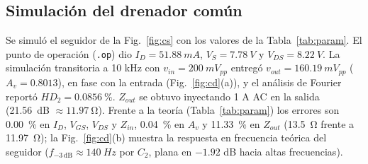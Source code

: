 \documentclass[conference]{IEEEtran}
\begin{document}
\subsection{Simulación del drenador común}
\label{sec:sim_cd}
Se simuló el seguidor de la Fig.~\ref{fig:cs} con los valores de la Tabla~\ref{tab:param}. El punto de operación (\texttt{.op}) dio $I_D=\SI{51.88}{mA}$, $V_S=\SI{7.78}{V}$ y $V_{DS}=\SI{8.22}{V}$. La simulación transitoria a 10 kHz con $v_{in}=\SI{200}{mV_{pp}}$ entregó $v_{out}=\SI{160.19}{mV_{pp}}$ ($A_v=0.8013$), en fase con la entrada (Fig.~\ref{fig:cd}(a)), y el análisis de Fourier reportó $HD_2=\SI{0.0856}{\percent}$. $Z_{out}$ se obtuvo inyectando 1 A AC en la salida (\SI{21.56}{dB} $\approx\SI{11.97}{\ohm}$). Frente a la teoría (Tabla~\ref{tab:param}) los errores son \SI{0.00}{\percent} en $I_D$, $V_{GS}$, $V_{DS}$ y $Z_{in}$, \SI{0.04}{\percent} en $A_v$ y \SI{11.33}{\percent} en $Z_{out}$ (\SI{13.5}{\ohm} frente a \SI{11.97}{\ohm}); la Fig.~\ref{fig:cd}(b) muestra la respuesta en frecuencia teórica del seguidor ($f_{-3\,\mathrm{dB}}\approx\SI{140}{Hz}$ por $C_2$, plana en $-1.92$ dB hacia altas frecuencias).
\end{document}
